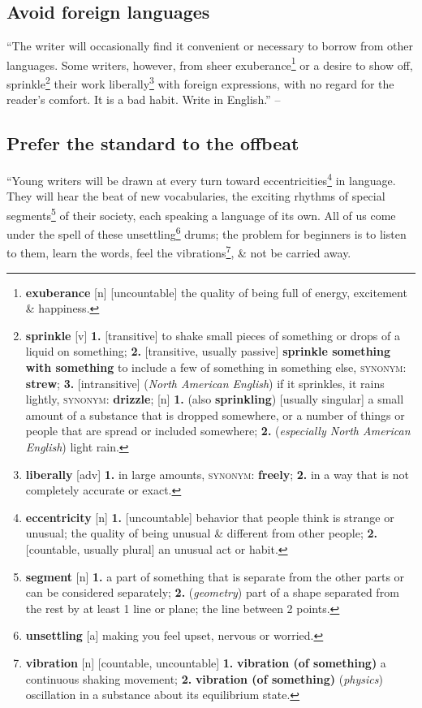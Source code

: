 \documentclass[oneside]{book}
\numberwithin{equation}{section}
\begin{document}
\subsection{Avoid foreign languages}
``The writer will occasionally find it convenient or necessary to borrow from other languages. Some writers, however, from sheer exuberance\footnote{\textbf{exuberance} [n] [uncountable] the quality of being full of energy, excitement \& happiness.} or a desire to show off, sprinkle\footnote{\textbf{sprinkle} [v] \textbf{1.} [transitive] to shake small pieces of something or drops of a liquid on something; \textbf{2.} [transitive, usually passive] \textbf{sprinkle something with something} to include a few of something in something else, \textsc{synonym}: \textbf{strew}; \textbf{3.} [intransitive] (\textit{North American English}) if it sprinkles, it rains lightly, \textsc{synonym}: \textbf{drizzle}; [n] \textbf{1.} (also \textbf{sprinkling}) [usually singular] a small amount of a substance that is dropped somewhere, or a number of things or people that are spread or included somewhere; \textbf{2.} (\textit{especially North American English}) light rain.} their work liberally\footnote{\textbf{liberally} [adv] \textbf{1.} in large amounts, \textsc{synonym}: \textbf{freely}; \textbf{2.} in a way that is not completely accurate or exact.} with foreign expressions, with no regard for the reader's comfort. It is a bad habit. Write in English.'' -- \cite[Chap. 5, Sect. 20, p. 99]{Strunk_White2019}

\subsection{Prefer the standard to the offbeat}
``Young writers will be drawn at every turn toward eccentricities\footnote{\textbf{eccentricity} [n] \textbf{1.} [uncountable] behavior that people think is strange or unusual; the quality of being unusual \& different from other people; \textbf{2.} [countable, usually plural] an unusual act or habit.}  in language. They will hear the beat of new vocabularies, the exciting rhythms of special segments\footnote{\textbf{segment} [n] \textbf{1.} a part of something that is separate from the other parts or can be considered separately; \textbf{2.} (\textit{geometry}) part of a shape separated from the rest by at least 1 line or plane; the line between 2 points.} of their society, each speaking a language of its own. All of us come under the spell of these unsettling\footnote{\textbf{unsettling} [a] making you feel upset, nervous or worried.} drums; the problem for beginners is to listen to them, learn the words, feel the vibrations\footnote{\textbf{vibration} [n] [countable, uncountable] \textbf{1.} \textbf{vibration (of something)} a continuous shaking movement; \textbf{2.} \textbf{vibration (of something)} (\textit{physics}) oscillation in a substance about its equilibrium state.}, \& not be carried away.
\end{document}
